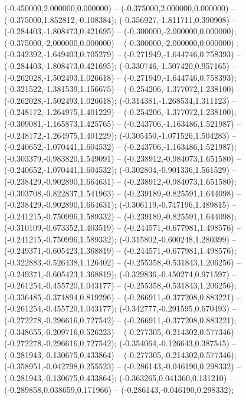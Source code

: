  (-0.450000,2.000000,0.000000) -- (-0.375000,2.000000,0.000000) -- (-0.375000,1.852812,-0.108384);
 (-0.356927,-1.811711,0.390908) -- (-0.284403,-1.808473,0.421695) -- (-0.300000,-2.000000,0.000000);
 (-0.375000,-2.000000,0.000000) -- (-0.300000,-2.000000,0.000000) ;
 (-0.342392,-1.649403,0.705279) -- (-0.271949,-1.644746,0.758393) -- (-0.284403,-1.808473,0.421695);
 (-0.330746,-1.507420,0.957165) -- (-0.262028,-1.502493,1.026618) -- (-0.271949,-1.644746,0.758393);
 (-0.321522,-1.381539,1.156675) -- (-0.254206,-1.377072,1.238100) -- (-0.262028,-1.502493,1.026618);
 (-0.314381,-1.268534,1.311123) -- (-0.248172,-1.264975,1.401229) -- (-0.254206,-1.377072,1.238100);
 (-0.309081,-1.165873,1.425765) -- (-0.243706,-1.163486,1.521987) -- (-0.248172,-1.264975,1.401229);
 (-0.305450,-1.071526,1.504283) -- (-0.240652,-1.070441,1.604532) -- (-0.243706,-1.163486,1.521987);
 (-0.303379,-0.983820,1.549091) -- (-0.238912,-0.984073,1.651580) -- (-0.240652,-1.070441,1.604532);
 (-0.302804,-0.901336,1.561529) -- (-0.238429,-0.902890,1.664631) -- (-0.238912,-0.984073,1.651580);
 (-0.303708,-0.822837,1.541963) -- (-0.239189,-0.825591,1.644098) -- (-0.238429,-0.902890,1.664631);
 (-0.306119,-0.747196,1.489815) -- (-0.241215,-0.750996,1.589332) -- (-0.239189,-0.825591,1.644098);
 (-0.310109,-0.673352,1.403519) -- (-0.244571,-0.677981,1.498576) -- (-0.241215,-0.750996,1.589332);
 (-0.315802,-0.600248,1.280399) -- (-0.249371,-0.605423,1.368819) -- (-0.244571,-0.677981,1.498576);
 (-0.322883,-0.526438,1.126402) -- (-0.255358,-0.531843,1.206256) -- (-0.249371,-0.605423,1.368819);
 (-0.329836,-0.450274,0.971597) -- (-0.261254,-0.455720,1.043177) -- (-0.255358,-0.531843,1.206256);
 (-0.336485,-0.371894,0.819296) -- (-0.266911,-0.377208,0.883221) -- (-0.261254,-0.455720,1.043177);
 (-0.342777,-0.291595,0.670493) -- (-0.272278,-0.296616,0.727542) -- (-0.266911,-0.377208,0.883221);
 (-0.348655,-0.209716,0.526223) -- (-0.277305,-0.214302,0.577346) -- (-0.272278,-0.296616,0.727542);
 (-0.354064,-0.126643,0.387545) -- (-0.281943,-0.130675,0.433864) -- (-0.277305,-0.214302,0.577346);
 (-0.358951,-0.042798,0.255523) -- (-0.286143,-0.046190,0.298332) -- (-0.281943,-0.130675,0.433864);
 (-0.363265,0.041360,0.131210) -- (-0.289858,0.038659,0.171966) -- (-0.286143,-0.046190,0.298332);
